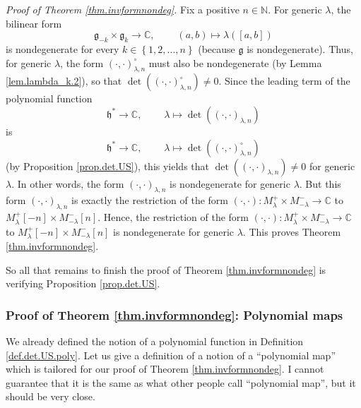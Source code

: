 \documentclass[etingof-lie.tex]{subfiles}
\begin{document}
\textit{Proof of Theorem \ref{thm.invformnondeg}.} Fix a positive
$n\in\mathbb{N}$. For generic $\lambda$, the bilinear form%
\[
\mathfrak{g}_{-k}\times\mathfrak{g}_{k}\rightarrow\mathbb{C}%
,\ \ \ \ \ \ \ \ \ \ \left(  a,b\right)  \mapsto\lambda\left(  \left[
a,b\right]  \right)
\]
is nondegenerate for every $k\in\left\{  1,2,...,n\right\}  $ (because
$\mathfrak{g}$ is nondegenerate). Thus, for generic $\lambda$, the form
$\left(  \cdot,\cdot\right)  _{\lambda,n}^{\circ}$ must also be nondegenerate
(by Lemma \ref{lem.lambda_k.2}), so that $\det\left(  \left(  \cdot
,\cdot\right)  _{\lambda,n}^{\circ}\right)  \neq0$. Since the leading term of
the polynomial function
\[
\mathfrak{h}^{\ast}\rightarrow\mathbb{C},\ \ \ \ \ \ \ \ \ \ \lambda
\mapsto\det\left(  \left(  \cdot,\cdot\right)  _{\lambda,n}\right)
\]
is%
\[
\mathfrak{h}^{\ast}\rightarrow\mathbb{C},\ \ \ \ \ \ \ \ \ \ \lambda
\mapsto\det\left(  \left(  \cdot,\cdot\right)  _{\lambda,n}^{\circ}\right)
\]
(by Proposition \ref{prop.det.US}), this yields that $\det\left(  \left(
\cdot,\cdot\right)  _{\lambda,n}\right)  \neq0$ for generic $\lambda$. In
other words, the form $\left(  \cdot,\cdot\right)  _{\lambda,n}$ is
nondegenerate for generic $\lambda$. But this form $\left(  \cdot
,\cdot\right)  _{\lambda,n}$ is exactly the restriction of the form $\left(
\cdot,\cdot\right)  :M_{\lambda}^{+}\times M_{-\lambda}^{-}\rightarrow
\mathbb{C}$ to $M_{\lambda}^{+}\left[  -n\right]  \times M_{-\lambda}%
^{-}\left[  n\right]  $. Hence, the restriction of the form $\left(
\cdot,\cdot\right)  :M_{\lambda}^{+}\times M_{-\lambda}^{-}\rightarrow
\mathbb{C}$ to $M_{\lambda}^{+}\left[  -n\right]  \times M_{-\lambda}%
^{-}\left[  n\right]  $ is nondegenerate for generic $\lambda$. This proves
Theorem \ref{thm.invformnondeg}.

So all that remains to finish the proof of Theorem \ref{thm.invformnondeg} is
verifying Proposition \ref{prop.det.US}.

\subsubsection{Proof of Theorem \ref{thm.invformnondeg}: Polynomial maps}

We already defined the notion of a polynomial function in Definition
\ref{def.det.US.poly}. Let us give a definition of a notion of a ``polynomial
map'' which is tailored for our proof of Theorem \ref{thm.invformnondeg}. I
cannot guarantee that it is the same as what other people call ``polynomial
map'', but it should be very close.
\end{document}
